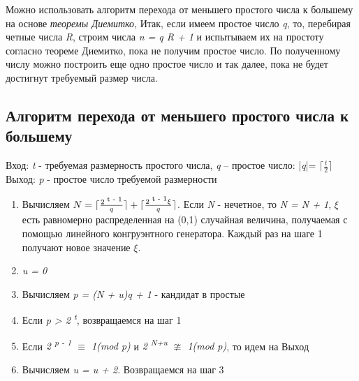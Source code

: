 \begin{comment}
  Если число \textit{N} выдержало все тесты на простоту, то появляется надежда на то, что \textit{N} - простое число, и следует попытаться 
  доказать простоту с помощью \textit{теоремы Диемитко}. Для этого можно случайным образом выбирать число \textit{a, 1 < a < N},
  и проверять для него выполнимость соотношений

  \begin{equation}
    \textit{a\textsuperscript{ N - 1} {$\equiv$} (mod N), (a\textsuperscript{ R} - 1, N) = 1}.
  \end{equation}
  
  Если при выбранном \textit{a} эти соотношения выполняются, то, согласно следствию из \textit{теоремы Диемитко}, можно 
  утверждать, что число \textit{N} простое. Если же эти условия нарушаются, нужно выбрать другое значение \textit{a} и повторять 
  эти операции до тех пор, пока такое число не будет обнаружено.
  \end{comment}
  
  Можно использовать алгоритм перехода от меньшего простого числа к большему на основе \textit{теоремы Диемитко},
  Итак, если имеем простое число \textit{q}, то, перебирая четные числа \textit{R}, строим числа \textit{n = q R + 1} и испытываем их на 
  простоту согласно теореме Диемитко, пока не получим простое число. По полученному числу можно построить еще одно простое число и так далее,
  пока не будет достигнут требуемый размер числа. 

  
  \subsection{Алгоритм перехода от меньшего простого числа к большему}
    Вход: \textit{t} - требуемая размерность простого числа, \textit{q} – простое число: |\textit{q}|= \textit{{$\lceil \frac{t}{2} \rceil$}}
    Выход: \textit{p} - простое число требуемой размерности
    
      \begin{enumerate}
      \item Вычисляем \textit{{$N = \lceil \frac{2\textsuperscript{ t - 1}}{q} \rceil + \lceil \frac{2\textsuperscript{ t - 1} \xi}{q} \rceil$}}. 
      Если \textit{N} - нечетное, то \textit{N = N + 1}, \textit{{$\xi$}} есть равномерно распределенная на (0,1) случайная величина, получаемая с помощью 
      линейного конгруэнтного генератора. Каждый раз на шаге 1 получают новое значение \textit{{$\xi$}}.
      \item \textit{u = 0}
      \item Вычисляем \textit{p = (N + u)q + 1} - кандидат в простые
      \item Если \textit{p > 2\textsuperscript{ t}}, возвращаемся на шаг 1
      \item Если \textit{2\textsuperscript{ p - 1} {$\equiv$} 1(mod p)} и \textit{2\textsuperscript{ N+u} {$\ncong$} 1(mod p)}, то идем на Выход
      \item Вычисляем \textit{u = u + 2}. Возвращаемся на шаг 3
      \end{enumerate}
      
